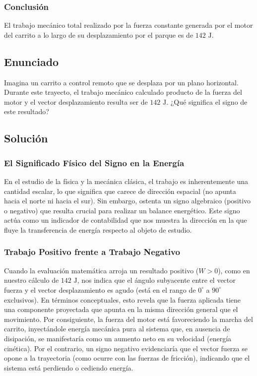 \documentclass[a4paper,12pt]{article}
\begin{document}
\subsubsection*{Conclusión}
El trabajo mecánico total realizado por la fuerza constante generada por el motor del carrito a lo largo de su desplazamiento por el parque es de $142\text{ J}$.

\newpage
\subsection*{Enunciado}
Imagina un carrito a control remoto que se desplaza por un plano horizontal. Durante este trayecto, el trabajo mecánico calculado producto de la fuerza del motor y el vector desplazamiento resulta ser de $142\text{ J}$.
¿Qué significa el signo de este resultado?

\subsection*{Solución}

\subsubsection*{El Significado Físico del Signo en la Energía}
En el estudio de la física y la mecánica clásica, el trabajo es inherentemente una cantidad escalar, lo que significa que carece de dirección espacial (no apunta hacia el norte ni hacia el sur). Sin embargo, ostenta un signo algebraico (positivo o negativo) que resulta crucial para realizar un balance energético. Este signo actúa como un indicador de contabilidad que nos muestra la dirección en la que fluye la transferencia de energía respecto al objeto de estudio.

\subsubsection*{Trabajo Positivo frente a Trabajo Negativo}
Cuando la evaluación matemática arroja un resultado positivo ($W > 0$), como en nuestro cálculo de $142\text{ J}$, nos indica que el ángulo subyacente entre el vector fuerza y el vector desplazamiento es agudo (está en el rango de $0^\circ$ a $90^\circ$ exclusivos). En términos conceptuales, esto revela que la fuerza aplicada tiene una componente proyectada que apunta en la misma dirección general que el movimiento. Por consiguiente, la fuerza del motor está favoreciendo la marcha del carrito, inyectándole energía mecánica pura al sistema que, en ausencia de disipación, se manifestaría como un aumento neto en su velocidad (energía cinética).
Por el contrario, un signo negativo evidenciaría que el vector fuerza se opone a la trayectoria (como ocurre con las fuerzas de fricción), indicando que el sistema está perdiendo o cediendo energía.
\end{document}
